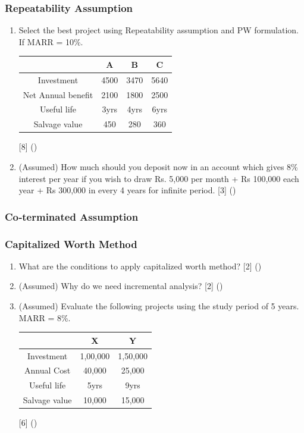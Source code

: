 \documentclass[12pt]{article}
\begin{document}
\subsubsection{Repeatability Assumption}
\begin{enumerate}[noitemsep, topsep=0pt]
	\item Select the best project using Repeatability assumption and PW formulation. If MARR = 10\%.\\
	\begin{tabular}{|c|c|c|c|}
		\hline
		 & A & B & C \\ \hline
		Investment & 4500 & 3470 & 5640 \\ \hline
		Net Annual benefit & 2100 & 1800 & 2500 \\ \hline
		Useful life & 3yrs & 4yrs & 6yrs \\ \hline
		Salvage value & 450 & 280 & 360 \\ \hline
	\end{tabular}\hfill [8] ()
	
	\item (Assumed) How much should you deposit now in an account which gives 8\% interest per year if you wish to draw Rs. 5,000 per month + Rs 100,000 each year + Rs 300,000 in every 4 years for infinite period. \hfill [3] ()
\end{enumerate}
\subsubsection{Co‐terminated Assumption}
\subsubsection{Capitalized Worth Method}
\begin{enumerate}[noitemsep, topsep=0pt]
	\item What are the conditions to apply capitalized worth method? \hfill [2] ()
	
	\item (Assumed) Why do we need incremental analysis? \hfill [2] ()

	\item (Assumed) Evaluate the following projects using the study period of 5 years. MARR = 8\%.\\
	\begin{tabular}{|c|c|c|}
		\hline
		 & X & Y \\ \hline
		Investment & 1,00,000 & 1,50,000 \\ \hline
		Annual Cost & 40,000 & 25,000 \\ \hline
		Useful life & 5yrs & 9yrs \\ \hline
		Salvage value & 10,000 & 15,000 \\ \hline
	\end{tabular} \hfill [6] ()
\end{enumerate}
\end{document}
